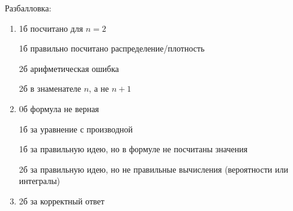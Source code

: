 \documentclass[12pt]{article}
\begin{document}
\begin{enumerate}
    Разбалловка:

    \begin{enumerate}
        \item 1б посчитано для $n=2$
        
        1б правильно посчитано распределение/плотность
        
        2б арифметическая ошибка
        
        2б в знаменателе $n$, а не $n+1$
        \item  0б формула не верная
        
        1б за уравнение с производной
        
        1б за правильную идею, но в формуле не посчитаны значения
        
        2б за правильную идею, но не правильные вычисления (вероятности или интегралы)
        \item 2б за корректный ответ
    \end{enumerate}


\end{enumerate}
\end{document}
